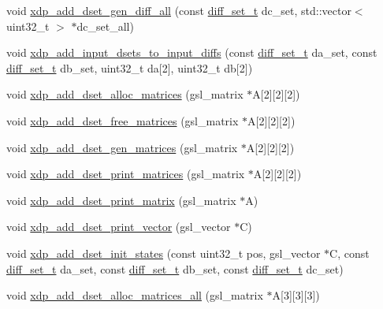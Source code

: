 \begin{DoxyCompactItemize}
\item 
void \hyperlink{xdp-add-diff-set_8cc_afb4ba884badd47b88a5f7cd9e68004e1}{xdp\-\_\-add\-\_\-dset\-\_\-gen\-\_\-diff\-\_\-all} (const \hyperlink{structdiff__set__t}{diff\-\_\-set\-\_\-t} dc\-\_\-set, std\-::vector$<$ uint32\-\_\-t $>$ $\ast$dc\-\_\-set\-\_\-all)
\item 
void \hyperlink{xdp-add-diff-set_8cc_a84427440715e6da72e843ff476f30c11}{xdp\-\_\-add\-\_\-input\-\_\-dsets\-\_\-to\-\_\-input\-\_\-diffs} (const \hyperlink{structdiff__set__t}{diff\-\_\-set\-\_\-t} da\-\_\-set, const \hyperlink{structdiff__set__t}{diff\-\_\-set\-\_\-t} db\-\_\-set, uint32\-\_\-t da\mbox{[}2\mbox{]}, uint32\-\_\-t db\mbox{[}2\mbox{]})
\item 
void \hyperlink{xdp-add-diff-set_8cc_aaaab7f820c7719fe4bebda5f972f46ac}{xdp\-\_\-add\-\_\-dset\-\_\-alloc\-\_\-matrices} (gsl\-\_\-matrix $\ast$\-A\mbox{[}2\mbox{]}\mbox{[}2\mbox{]}\mbox{[}2\mbox{]})
\item 
void \hyperlink{xdp-add-diff-set_8cc_a9de10d748f2c35c47ec10e0f8aede4ce}{xdp\-\_\-add\-\_\-dset\-\_\-free\-\_\-matrices} (gsl\-\_\-matrix $\ast$\-A\mbox{[}2\mbox{]}\mbox{[}2\mbox{]}\mbox{[}2\mbox{]})
\item 
void \hyperlink{xdp-add-diff-set_8cc_a27a7143f33c69fc9fddb78e9677435ad}{xdp\-\_\-add\-\_\-dset\-\_\-gen\-\_\-matrices} (gsl\-\_\-matrix $\ast$\-A\mbox{[}2\mbox{]}\mbox{[}2\mbox{]}\mbox{[}2\mbox{]})
\item 
void \hyperlink{xdp-add-diff-set_8cc_a86dbfb9fecf193fc3438437d34823b39}{xdp\-\_\-add\-\_\-dset\-\_\-print\-\_\-matrices} (gsl\-\_\-matrix $\ast$\-A\mbox{[}2\mbox{]}\mbox{[}2\mbox{]}\mbox{[}2\mbox{]})
\item 
void \hyperlink{xdp-add-diff-set_8cc_a9b7e890683b9052bfda8135b105c88b9}{xdp\-\_\-add\-\_\-dset\-\_\-print\-\_\-matrix} (gsl\-\_\-matrix $\ast$\-A)
\item 
void \hyperlink{xdp-add-diff-set_8cc_aedd05ba1c8824a770b5bdb9693b3b66a}{xdp\-\_\-add\-\_\-dset\-\_\-print\-\_\-vector} (gsl\-\_\-vector $\ast$\-C)
\item 
void \hyperlink{xdp-add-diff-set_8cc_a3be5af7d04a65417579b2f23542d1916}{xdp\-\_\-add\-\_\-dset\-\_\-init\-\_\-states} (const uint32\-\_\-t pos, gsl\-\_\-vector $\ast$\-C, const \hyperlink{structdiff__set__t}{diff\-\_\-set\-\_\-t} da\-\_\-set, const \hyperlink{structdiff__set__t}{diff\-\_\-set\-\_\-t} db\-\_\-set, const \hyperlink{structdiff__set__t}{diff\-\_\-set\-\_\-t} dc\-\_\-set)
\item 
void \hyperlink{xdp-add-diff-set_8cc_a3c2debae4a0c3272990e3927f73c2f2f}{xdp\-\_\-add\-\_\-dset\-\_\-alloc\-\_\-matrices\-\_\-all} (gsl\-\_\-matrix $\ast$\-A\mbox{[}3\mbox{]}\mbox{[}3\mbox{]}\mbox{[}3\mbox{]})

\end{DoxyCompactItemize}
